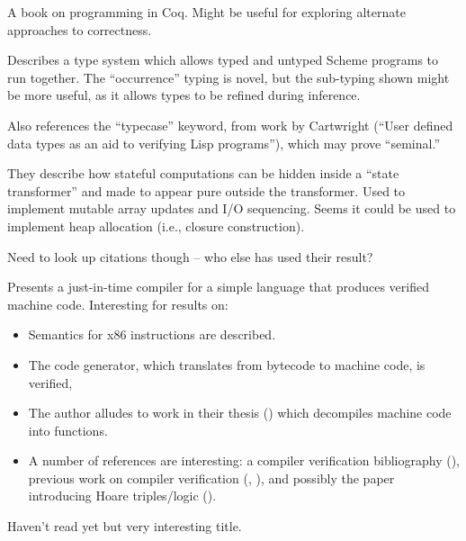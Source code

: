\documentclass[11pt]{article}
\begin{document}

A book on programming in Coq. Might be useful for exploring alternate
approaches to correctness.



Describes a type system which allows typed and untyped Scheme programs
to run together. The ``occurrence'' typing is novel, but the
sub-typing shown might be more useful, as it allows types to be refined
during inference.

Also references the ``typecase'' keyword, from work by Cartwright
(``User defined data types as an aid to verifying Lisp programs''), which may
prove ``seminal.''


They describe how stateful computations can be hidden inside a ``state
transformer'' and made to appear pure outside the transformer. Used to
implement mutable array updates and I/O sequencing. Seems it could be
used to implement heap allocation (i.e., closure construction).

Need to look up citations though -- who else has used their result?


Presents a just-in-time compiler for a simple language that 
produces verified machine code. Interesting for results on:

\begin{itemize}
\item Semantics for x86 instructions are described.
\item The code generator, which translates from bytecode to machine code,
is verified,
\item The author alludes to work in their thesis (\cite{Myreen09Formal}) which
decompiles machine code into functions.
\item A number of references are interesting: a compiler verification
  bibliography (\cite{Dave03Compiler}), previous work on compiler verification (\cite{Myreen09Extensible},
  \cite{Myreen08Machine}), and possibly the paper introducing Hoare triples/logic (\cite{Hoare69Axiomatic}).
 
\end{itemize}


Haven't read yet but very interesting title.
\end{document}
